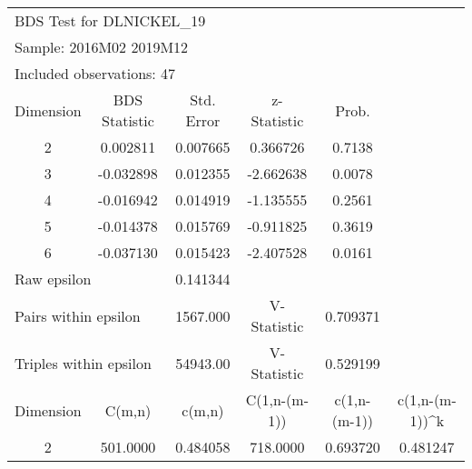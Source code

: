 \begin{tabular}{lrrrrr}
\toprule
\multicolumn{3}{l}{BDS Test for DLNICKEL\_19}&\multicolumn{1}{c}{}&\multicolumn{1}{c}{}&\multicolumn{1}{c}{}\\
\multicolumn{3}{l}{Sample: 2016M02 2019M12}&\multicolumn{1}{c}{}&\multicolumn{1}{c}{}&\multicolumn{1}{c}{}\\
\multicolumn{3}{l}{Included observations: 47}&\multicolumn{1}{c}{}&\multicolumn{1}{c}{}&\multicolumn{1}{c}{}\\
\midrule
\multicolumn{1}{c}{Dimension}&\multicolumn{1}{c}{BDS Statistic}&\multicolumn{1}{c}{Std. Error}&\multicolumn{1}{c}{z-Statistic}&\multicolumn{1}{c}{Prob.}&\multicolumn{1}{c}{}\\
\multicolumn{1}{c}{2}&\multicolumn{1}{c}{0.002811}&\multicolumn{1}{c}{0.007665}&\multicolumn{1}{c}{0.366726}&\multicolumn{1}{c}{0.7138}&\multicolumn{1}{c}{}\\
\multicolumn{1}{c}{3}&\multicolumn{1}{c}{-0.032898}&\multicolumn{1}{c}{0.012355}&\multicolumn{1}{c}{-2.662638}&\multicolumn{1}{c}{0.0078}&\multicolumn{1}{c}{}\\
\multicolumn{1}{c}{4}&\multicolumn{1}{c}{-0.016942}&\multicolumn{1}{c}{0.014919}&\multicolumn{1}{c}{-1.135555}&\multicolumn{1}{c}{0.2561}&\multicolumn{1}{c}{}\\
\multicolumn{1}{c}{5}&\multicolumn{1}{c}{-0.014378}&\multicolumn{1}{c}{0.015769}&\multicolumn{1}{c}{-0.911825}&\multicolumn{1}{c}{0.3619}&\multicolumn{1}{c}{}\\
\multicolumn{1}{c}{6}&\multicolumn{1}{c}{-0.037130}&\multicolumn{1}{c}{0.015423}&\multicolumn{1}{c}{-2.407528}&\multicolumn{1}{c}{0.0161}&\multicolumn{1}{c}{}\\
\midrule
\multicolumn{2}{l}{Raw epsilon}&\multicolumn{1}{c}{0.141344}&\multicolumn{1}{c}{}&\multicolumn{1}{c}{}&\multicolumn{1}{c}{}\\
\multicolumn{2}{l}{Pairs within epsilon}&\multicolumn{1}{c}{1567.000}&\multicolumn{1}{c}{V-Statistic}&\multicolumn{1}{c}{0.709371}&\multicolumn{1}{c}{}\\
\multicolumn{2}{l}{Triples within epsilon}&\multicolumn{1}{c}{54943.00}&\multicolumn{1}{c}{V-Statistic}&\multicolumn{1}{c}{0.529199}&\multicolumn{1}{c}{}\\
\midrule
\multicolumn{1}{c}{Dimension}&\multicolumn{1}{c}{C(m,n)}&\multicolumn{1}{c}{c(m,n)}&\multicolumn{1}{c}{C(1,n-(m-1))}&\multicolumn{1}{c}{c(1,n-(m-1))}&\multicolumn{1}{c}{c(1,n-(m-1))\textasciicircum k}\\
\multicolumn{1}{c}{2}&\multicolumn{1}{c}{501.0000}&\multicolumn{1}{c}{0.484058}&\multicolumn{1}{c}{718.0000}&\multicolumn{1}{c}{0.693720}&\multicolumn{1}{c}{0.481247}\\

\end{tabular}

